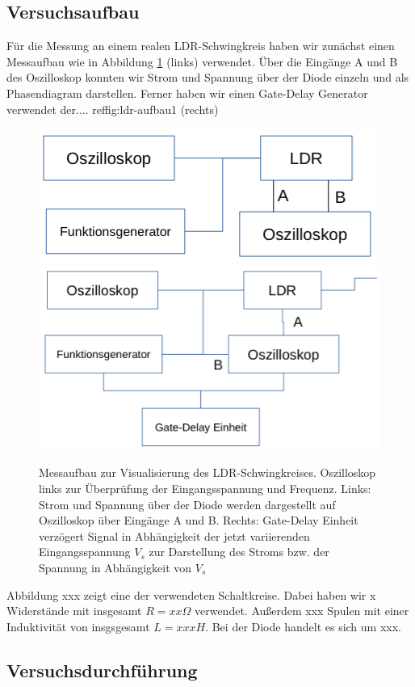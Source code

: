\documentclass{scrartcl}
\begin{document}
\subsection{ Versuchsaufbau}
Für die Messung an einem realen LDR-Schwingkreis haben wir zunächst einen Messaufbau wie in Abbildung \ref{fig:ldr-aufbau1} (links) verwendet. Über die Eingänge A und B des Oszilloskop konnten wir Strom und Spannung über der Diode einzeln und als Phasendiagram darstellen. Ferner haben wir einen Gate-Delay Generator verwendet der.... ref{fig:ldr-aufbau1} (rechts)
\begin{figure}
\includegraphics[scale=0.6]{aufbau1}
\includegraphics[scale=0.5]{aufbau2}
\caption{Messaufbau zur Visualisierung des LDR-Schwingkreises. Oszilloskop links zur Überprüfung der Eingangsspannung und Frequenz. Links: Strom und Spannung über der Diode werden dargestellt auf Oszilloskop über Eingänge A und B. Rechts: Gate-Delay Einheit verzögert Signal in Abhängigkeit der jetzt variierenden Eingangsspannung $V_s$ zur Darstellung des Stroms bzw. der Spannung in Abhängigkeit von $V_s$ }
\label{fig:ldr-aufbau1}
\end{figure}
Abbildung xxx zeigt eine der verwendeten Schaltkreise. Dabei haben wir x Widerstände mit insgesamt $R=xx\Omega$ verwendet. Außerdem xxx Spulen mit einer Induktivität von insgsgesamt $L=xxxH$. Bei der Diode handelt es sich um xxx. 

\subsection { Versuchsdurchführung }
\end{document}
